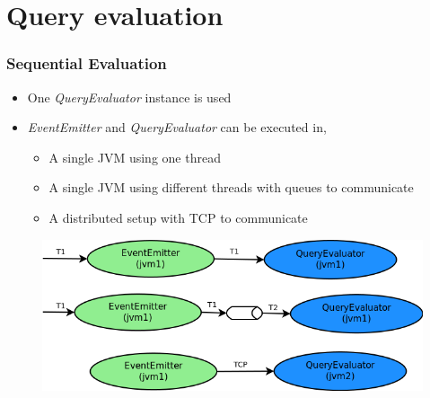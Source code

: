 \documentclass{beamer}
\begin{document}
\section{Query evaluation}

\begin{frame}
\frametitle{Sequential Evaluation}

\begin{itemize}
        \item One \textit{QueryEvaluator} instance is used
        \item \textit{EventEmitter} and \textit{QueryEvaluator} can be executed in,
                \begin{itemize}
                        \item A single JVM using one thread
                        \item A single JVM using different threads with queues to communicate
                        \item A distributed setup with TCP to communicate 
                \end{itemize}
\end{itemize}

\begin{figure}
        \includegraphics[width=0.7\linewidth]{sequential.png}
\end{figure}

\end{frame}
\end{document}
